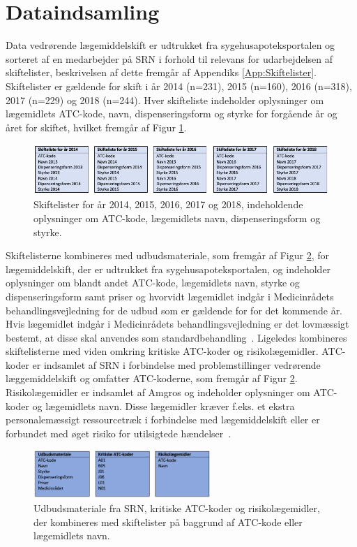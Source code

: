 \section{Dataindsamling}
Data vedrørende lægemiddelskift er udtrukket fra sygehusapoteksportalen og sorteret af en medarbejder på SRN i forhold til relevans for udarbejdelsen af skiftelister, beskrivelsen af dette fremgår af Appendiks \ref{App:Skiftelister}. Skiftelister er gældende for skift i år 2014 (n=231), 2015 (n=160), 2016 (n=318), 2017 (n=229) og 2018 (n=244). Hver skifteliste indeholder oplysninger om lægemidlets ATC-kode, navn, dispenseringsform og styrke for forgående år og året for skiftet, hvilket fremgår af Figur \ref{fig:Input}.

\vspace{0.2cm}
\begin{figure}[H]\centering
\includegraphics[width=1\textwidth]{billeder/Input1.png} 
	\caption{Skiftelister for år 2014, 2015, 2016, 2017 og 2018, indeholdende oplysninger om ATC-kode, lægemidlets navn, dispenseringsform og styrke.}
	\label{fig:Input}  
\end{figure}

Skiftelisterne kombineres med udbudsmateriale, som fremgår af Figur \ref{fig:Input2}, for lægemiddelskift, der er udtrukket fra sygehusapoteksportalen, og indeholder oplysninger om blandt andet ATC-kode, lægemidlets navn, styrke og dispenseringsform samt priser og hvorvidt lægemidlet indgår i Medicinrådets behandlingsvejledning for de udbud som er gældende for for det kommende år. Hvis lægemidlet indgår i Medicinrådets behandlingsvejledning er det lovmæssigt bestemt, at disse skal anvendes som standardbehandling~\citep{Medicinradet2018}.
Ligeledes kombineres skiftelisterne med viden omkring kritiske ATC-koder og risikolægemidler. ATC-koder er indsamlet af SRN i forbindelse med problemstillinger vedrørende læggemiddelskift og omfatter ATC-koderne, som fremgår af Figur \ref{fig:Input2}. Risikolægemidler er indsamlet af Amgros og indeholder oplysninger om ATC-koder og lægemidlets navn. Disse lægemidler kræver f.eks. et ekstra personalemæssigt ressourcetræk i forbindelse med lægemiddelskift eller er forbundet med øget risiko for utilsigtede hændelser~\citep{Amgros}. 

\vspace{0.2cm}
\begin{figure}[H]\centering
\includegraphics[width=0.6\textwidth]{billeder/Input2.png} 
	\caption{Udbudsmateriale fra SRN, kritiske ATC-koder og risikolægemidler, der kombineres med skiftelister på baggrund af ATC-kode eller lægemidlets navn.}
	\label{fig:Input2}  
\end{figure}

